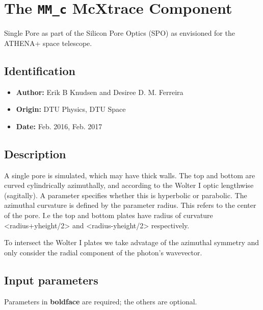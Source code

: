 \section{The \texttt{MM\_c} McXtrace Component}
Single Pore as part of the Silicon Pore Optics (SPO) as envisioned for the ATHENA+ space telescope.

\subsection*{Identification}
\begin{itemize}
  \item \textbf{Author:} Erik B Knudsen and Desiree D. M. Ferreira
  \item \textbf{Origin:} DTU Physics, DTU Space
  \item \textbf{Date:} Feb. 2016, Feb. 2017
\end{itemize}

\subsection*{Description}
A single pore is simulated, which may have thick walls. The top and bottom are curved cylindrically azimuthally, and according to the Wolter I optic lengthwise (sagitally). A parameter specifies whether this is hyperbolic or parabolic. The azimuthal curvature is defined by the parameter radius. This refers to the center of the pore. I.e the top and bottom plates have radius of curvature \textless{}radius+yheight/2\textgreater{} and \textless{}radius-yheight/2\textgreater{} respectively.

To intersect the Wolter I plates we take advatage of the azimuthal symmetry and only consider the radial component of the photon's wavevector.

\subsection*{Input parameters}
Parameters in \textbf{boldface} are required; the others are optional.


